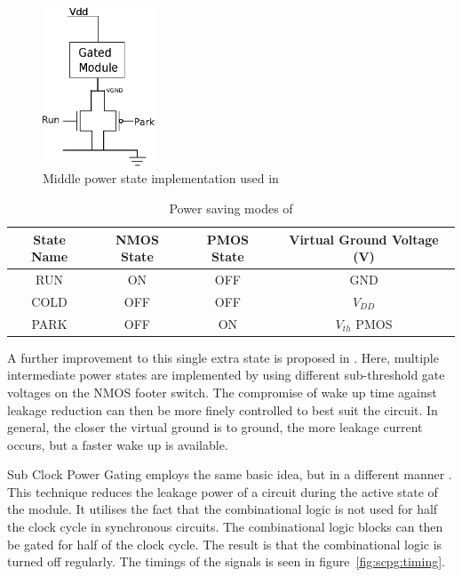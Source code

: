 \begin{figure}
\centering
\includegraphics[width=0.3\textwidth]{Figures/powergating_kim.eps}
\caption{Middle power state implementation used in \cite{kim2004experimental}}
\label{fig:kim}
\end{figure}

\begin{table}
\caption{Power saving modes of \cite{kim2004experimental}}
\label{tab:kim}
\centering
\begin{tabular}{|c|c|c|c|}\hline
State Name & NMOS State & PMOS State & Virtual Ground Voltage (V)\\ \hline
RUN  & ON   & OFF  & GND \\
COLD & OFF  & OFF  & $V_{DD}$ \\
PARK & OFF  & ON   & $V_{th}$ PMOS \\ \hline
\end{tabular}
\end{table}

A further improvement to this single extra state is proposed in \cite{singh2007enhanced}. 
Here, multiple intermediate power states are implemented by using different sub-threshold gate voltages on the NMOS footer switch. 
The compromise of wake up time against leakage reduction can then be more finely controlled to best suit the circuit.
In general, the closer the virtual ground is to ground, the more leakage current occurs, but a faster wake up is available. 

Sub Clock Power Gating employs the same basic idea, but in a different manner \cite{mistry2011sub}.
This technique reduces the leakage power of a circuit during the active state of the module.
It utilises the fact that the combinational logic is not used for half the clock cycle in synchronous circuits.
The combinational logic blocks can then be gated for half of the clock cycle.
The result is that the combinational logic is turned off regularly. 
The timings of the signals is seen in figure~\ref{fig:scpg:timing}.

